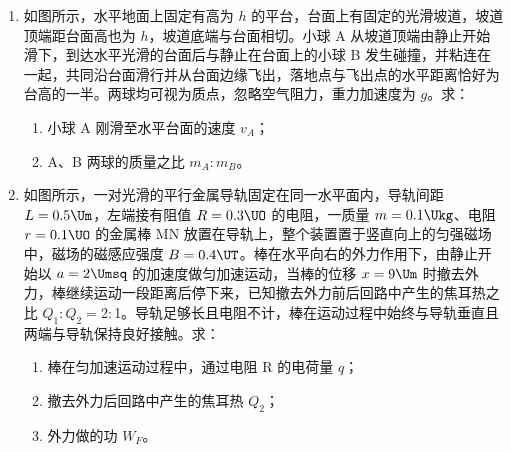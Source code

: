 \documentclass[\gkver]{gaokaozhenti}
\begin{document}
\begin{enumerate}
\item
如图所示，水平地面上固定有高为 $h$ 的平台，台面上有固定的光滑坡道，坡道顶端距台面高也为 $h$，坡道底端与台面相切。小球 A 从坡道顶端由静止开始滑下，到达水平光滑的台面后与静止在台面上的小球 B 发生碰撞，并粘连在一起，共同沿台面滑行并从台面边缘飞出，落地点与飞出点的水平距离恰好为台高的一半。两球均可视为质点，忽略空气阻力，重力加速度为 $g$。求：
\begin{enumerate}
	\item
	小球 A 刚滑至水平台面的速度 $v_{A}$；
	\item
	A、B 两球的质量之比 $m_{A}:m_{B}$。
\end{enumerate}

\item
如图所示，一对光滑的平行金属导轨固定在同一水平面内，导轨间距 $L=0.5\Um$，左端接有阻值 $R=0.3\UO$ 的电阻，一质量 $m=0.1\Ukg$、电阻 $r=0.1\UO$ 的金属棒 MN 放置在导轨上，整个装置置于竖直向上的匀强磁场中，磁场的磁感应强度 $B=0.4\UT$。棒在水平向右的外力作用下，由静止开始以 $a=2\Umsq$ 的加速度做匀加速运动，当棒的位移 $x=9\Um$ 时撤去外力，棒继续运动一段距离后停下来，已知撤去外力前后回路中产生的焦耳热之比 $Q_{1}:Q_{2}=$2$:$1。导轨足够长且电阻不计，棒在运动过程中始终与导轨垂直且两端与导轨保持良好接触。求：
\begin{enumerate}
	\item
	棒在匀加速运动过程中，通过电阻 R 的电荷量 $q$；
	\item
	撤去外力后回路中产生的焦耳热 $Q_{2}$；
	\item
	外力做的功 $W_{F}$。
\end{enumerate}
\jdanswer{
\begin{enumerate}
	\item
	$4.5\UC$


\end{enumerate}}
\end{enumerate}
\end{document}
